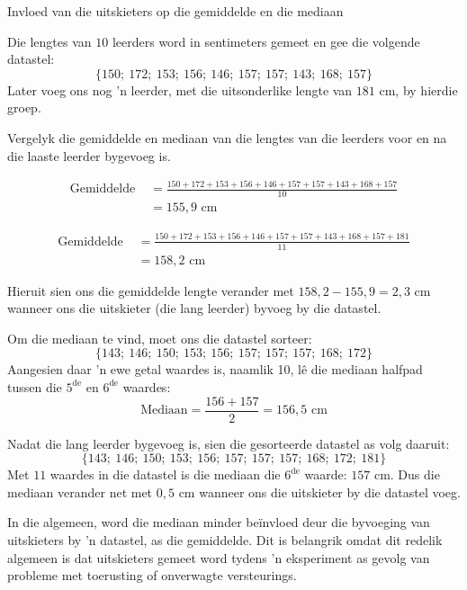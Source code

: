 \begin{wex}{Invloed van die uitskieters op die gemiddelde en die mediaan}
{Die lengtes van $10$ leerders word in sentimeters gemeet en gee die volgende datastel:
    \begin{equation*}
      \{150;\ 172;\ 153;\ 156;\ 146;\ 157;\ 157;\ 143;\ 168;\ 157\}
    \end{equation*}
    Later voeg ons nog ’n leerder, met die uitsonderlike lengte van $181$ cm, by hierdie groep.

   Vergelyk die gemiddelde en mediaan van die lengtes van die leerders voor en na die laaste leerder bygevoeg is.
}{

  \begin{align*}
    \mbox{Gemiddelde } &=\frac{150 + 172 + 153 + 156 + 146 + 157 + 157 + 143 + 168 + 157}{10}\\
    &= 155,9\mbox{ cm}
  \end{align*}


  \begin{align*}
    \mbox{Gemiddelde } &= \frac{150 + 172 + 153 + 156 + 146 + 157 + 157 + 143 + 168 + 157 + 181}{11}\\
    &= 158,2\mbox{ cm}
  \end{align*}

  Hieruit sien ons die gemiddelde lengte verander met 
  $158,2 - 155,9 = 2,3\mbox{ cm}$ wanneer ons die uitskieter (die lang leerder) byvoeg by die datastel.


  Om die mediaan te vind, moet ons die datastel sorteer:
  \begin{equation*}
    \{143;\ 146;\ 150;\ 153;\ 156;\ 157;\ 157;\ 157;\ 168;\ 172\}
  \end{equation*}
  Aangesien daar ’n ewe getal waardes is, naamlik 10, lê die mediaan halfpad tussen die $5^{\mathrm{de}}$ en $6^{\mathrm{de}}$ waardes:
  \begin{equation*}
    \mbox{Mediaan} =\frac{156+157}{2} = 156,5\mbox{ cm}
  \end{equation*}


  Nadat die lang leerder bygevoeg is, sien die gesorteerde datastel as volg daaruit:
  \begin{equation*}
    \{143;\ 146;\ 150;\ 153;\ 156;\ 157;\ 157;\ 157;\ 168;\ 172;\ 181\}
  \end{equation*}
  Met $11$ waardes in die datastel is die mediaan die $6^{\mathrm{de}}$ waarde: $157$ cm.
  Dus die mediaan verander net met $0,5$ cm wanneer ons die uitskieter by die datastel voeg.

 In die algemeen, word die mediaan minder beïnvloed deur die byvoeging van uitskieters by ’n datastel, as die gemiddelde. Dit is belangrik omdat dit redelik algemeen is dat uitskieters gemeet word tydens ’n eksperiment as gevolg van probleme met toerusting of onverwagte versteurings.
}
\end{wex}

